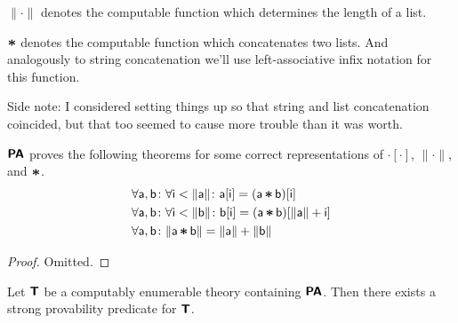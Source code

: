 \documentclass{article}
\theoremstyle{customstyle}
\newenvironment{prf}{\begin{mdframed}[skipabove=5pt, backgroundcolor=Gray!10, topline=false, bottomline=false, leftline=false, rightline=false]\begin{proof}}{\end{proof}\end{mdframed}}
\DeclareMathOperator*{\bast}{\scalebox{1.15}{$\bm{\ast}$}}
\newcommand{\T}{\textbf{\textsf{T}}}
\newcommand{\PA}{\textbf{\textsf{PA}}}
\begin{document}
\begin{definition}
  $\lVert \cdot \rVert$ denotes the computable function which determines the length of a list.
\end{definition}

\begin{definition}
  $\bast$ denotes the computable function which concatenates two lists. And analogously to string concatenation we'll use left-associative infix notation for this function.
\end{definition}

Side note: I considered setting things up so that string and list concatenation coincided, but that too seemed to cause more trouble than it was worth.

\begin{lemma}\label{lm-cat}
  $\PA$ proves the following theorems for some correct representations of $\cdot[\cdot]$, $\lVert \cdot \rVert$, and $\bast$.
  \begin{align*}
     & \mathsf{\forall a, b \colon \forall i < \lVert a \rVert \colon a[i] = (a \bast b)[i]}                   \\
     & \mathsf{\forall a, b \colon \forall i < \lVert b \rVert \colon b[i] = (a \bast b)[\lVert a \rVert + i]} \\
     & \mathsf{\forall a, b \colon \lVert a \bast b \rVert = \lVert a \rVert + \lVert b \rVert}
  \end{align*}
\end{lemma}

\begin{prf}
  Omitted.
\end{prf}

\begin{theorem}
  Let $\T$ be a computably enumerable theory containing $\PA$. Then there exists a strong provability predicate for $\T$.
\end{theorem}
\end{document}
